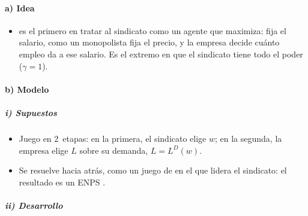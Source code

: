 \documentclass[11pt]{article}
\begin{document}
\paragraph{a) Idea}

\begin{itemize}
\item \textcite{Dunlop1944Wage} es el primero en tratar al sindicato como un agente que maximiza: fija el salario, como un monopolista fija el precio, y la empresa decide cuánto empleo da a ese salario. Es el extremo en que el sindicato tiene todo el poder ($\gamma=1$).
\end{itemize}

\paragraph{b) Modelo}

\subparagraph{i) Supuestos}

\begin{itemize}
\item Juego en 2~etapas: en la primera, el sindicato elige $w$; en la segunda, la empresa elige $L$ sobre su demanda, $L=L^D(w)$.
\item Se resuelve hacia atrás, como un juego de  en el que lidera el sindicato: el resultado es un ENPS .
\end{itemize}

\subparagraph{ii) Desarrollo}
\end{document}

